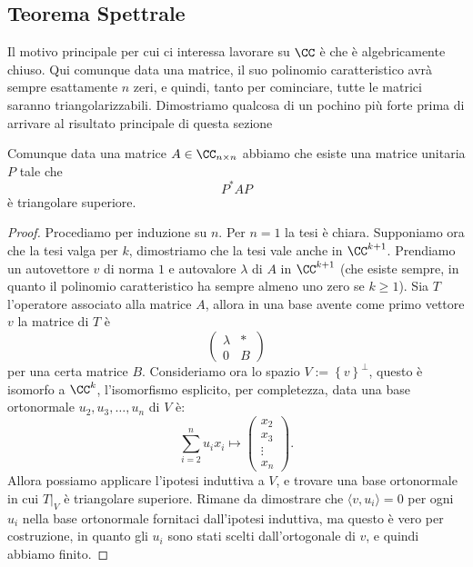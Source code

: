 \documentclass[11pt]{scrartcl}
\begin{document}
   	 \subsection{Teorema Spettrale}
   	 Il motivo principale per cui ci interessa lavorare su $\CC$ è che è algebricamente chiuso. Qui comunque data una matrice, il suo polinomio caratteristico avrà sempre esattamente $n$ zeri, e quindi, tanto per cominciare, tutte le matrici saranno triangolarizzabili. Dimostriamo qualcosa di un pochino più forte prima di arrivare al risultato principale di questa sezione
   	 \begin{lemma}
   	 	Comunque data una matrice $A\in \CC_{n\times n}$ abbiamo che esiste una matrice unitaria $P$ tale che
   	 	$$P^*AP$$
   	 	è triangolare superiore.
   	 \end{lemma}
   	 \begin{proof}
   	 	Procediamo per induzione su $n$. Per $n=1$ la tesi è chiara. Supponiamo ora che la tesi valga per $k$, dimostriamo che la tesi vale anche in $\CC^{k+1}$. Prendiamo un autovettore $v$ di norma $1$ e autovalore $\lambda$ di $A$ in $\CC^{k+1}$ (che esiste sempre, in quanto il polinomio caratteristico ha sempre almeno uno zero se $k\ge 1$). Sia $T$ l'operatore associato alla matrice $A$, allora in una base avente come primo vettore $v$ la matrice di $T$ è
   	 	$$
   	 	\left(
   	 	\begin{array}{c|c}
   	 		\lambda & * \\
   	 		\hline
   	 		0 & B
   	 	\end{array}
   	 	\right)
   	 	$$
   	 	per una certa matrice $B$. Consideriamo ora lo spazio $V:=\left\{v\right\}^\perp$, questo è isomorfo a $\CC^k$, l'isomorfismo esplicito, per completezza, data una base ortonormale $u_2,u_3,\dots,u_n$ di $V$ è:
   	 	$$\sum_{i=2}^{n}u_ix_i \mapsto \begin{pmatrix}
   	 		x_2 \\
   	 		x_3 \\
   	 		\vdots \\
   	 		x_n
   	 	\end{pmatrix}.$$
   	 	Allora possiamo applicare l'ipotesi induttiva a $V$, e trovare una base ortonormale in cui $T|_V$ è triangolare superiore. Rimane da dimostrare che $\langle v,u_i\rangle=0$ per ogni $u_i$ nella base ortonormale fornitaci dall'ipotesi induttiva, ma questo è vero per costruzione, in quanto gli $u_i$ sono stati scelti dall'ortogonale di $v$, e quindi abbiamo finito.
   	 \end{proof}
\end{document}
